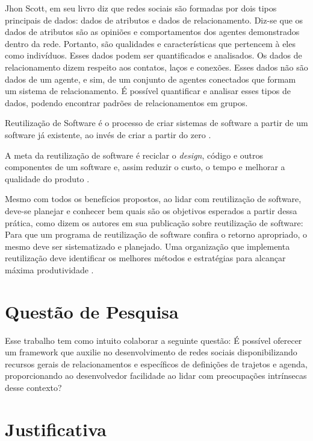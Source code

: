 Jhon Scott, em seu livro \cite{Scott:Carrington:2011} diz que redes sociais são formadas por dois tipos principais de dados: dados de atributos e dados de relacionamento. Diz-se que os dados de atributos são as opiniões e comportamentos dos agentes demonstrados dentro da rede. Portanto, são qualidades e características que pertencem à eles como indivíduos. Esses dados podem ser quantificados e analisados. Os dados de relacionamento dizem respeito aos contatos, laços e conexões. Esses dados não são dados de um agente, e sim, de um conjunto de agentes conectados que formam um sistema de relacionamento. É possível quantificar e analisar esses tipos de dados, podendo encontrar padrões de relacionamentos em grupos.

Reutilização de Software é o processo de criar sistemas de software a partir de um software já existente, ao invés de criar a partir do zero \cite{Krueger:1992}.

A meta da reutilização de software é reciclar o \textit{design}, código e outros componentes de um software e, assim reduzir o custo, o tempo e melhorar a qualidade do produto \cite{Keswani:Joshi:Jatain:2014}.

Mesmo com todos os benefícios propostos, ao lidar com reutilização de software, deve-se planejar e conhecer bem quais são os objetivos esperados a partir dessa prática, como dizem os autores em sua publicação sobre reutilização de software: Para que um programa de reutilização de software confira o retorno apropriado, o mesmo deve ser sistematizado e planejado. Uma organização que implementa reutilização deve identificar os melhores métodos e estratégias para alcançar máxima produtividade \cite{Keswani:Joshi:Jatain:2014}.

\section*{Questão de Pesquisa}
\label{sec:questao_pesquisa}

Esse trabalho tem como intuito colaborar a seguinte questão: É possível oferecer um framework que auxilie no desenvolvimento de redes sociais disponibilizando recursos gerais de relacionamentos e específicos de definições de trajetos e agenda, proporcionando ao desenvolvedor facilidade ao lidar com preocupações intrínsecas desse contexto?

\section*{Justificativa}
\label{sec:justificativa}

